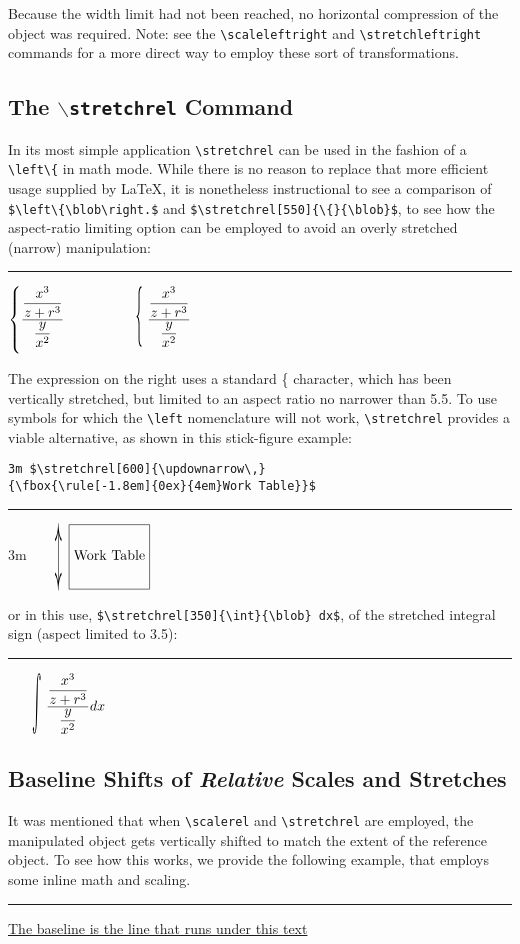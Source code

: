 \documentclass{article}
\newcommand\rl{\rule{2em}{0in}}
\let\vb\verb
\begin{document}
Because the width limit had not been reached, no horizontal compression
of the object was required.  Note: see the \vb|\scaleleftright| and
\vb|\stretchleftright| commands for a more direct way to employ these
sort of transformations.

\subsection{The $\backslash$\texttt{stretchrel} Command}

In its most simple application \vb|\stretchrel| can be used in the
fashion of a \vb|\left\{| in math mode.  While there is no reason to
replace that more efficient usage supplied by \LaTeX{}, it is
nonetheless instructional to see a comparison of 
\vb|$\left\{\blob\right.$| and \vb|$\stretchrel[550]{\{}{\blob}$|, to
see how the aspect-ratio limiting option can be employed to avoid an
overly stretched (narrow) manipulation:

\rl$\left\{\blob\right.$  ~~~~~ $\stretchrel[550]{\{}{\blob}$

The expression on the right uses a standard \{ character, which has 
  been vertically stretched, but limited to an aspect ratio no 
  narrower than 5.5.  
To use symbols for which the \vb|\left| nomenclature will not work,
  \vb|\stretchrel| provides a viable alternative, as shown in this
  stick-figure example:

\vb|3m $\stretchrel[600]{\updownarrow\,}|\\
\vb|{\fbox{\rule[-1.8em]{0ex}{4em}Work Table}}$|

\rl3m $\stretchrel[600]{\updownarrow\,}
  {\fbox{\rule[-1.8em]{0ex}{4em}Work Table}}$

or in this use, \vb|$\stretchrel[350]{\int}{\blob} dx$|, of the
stretched integral sign (aspect limited to 3.5):

\rl$\stretchrel[350]{\int}{\blob} dx$


\subsection{Baseline Shifts of \textit{Relative} Scales and Stretches}

It was mentioned that when \vb|\scalerel| and \vb|\stretchrel| are
employed, the manipulated object gets vertically shifted to match the
extent of the reference object.  To see how this works, we provide the
following example, that employs some inline math and scaling.  

\rl\underline{The baseline is the line that runs under this text}
\underline{}
\end{document}
